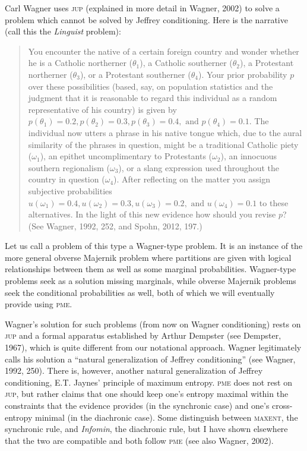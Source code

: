 \documentclass[entropy,article,submit,oneauthor,pdftex,12pt,a4paper]{mdpi}
\newcommand{\qeins}[1]{``#1''}
\newenvironment{quotex}{\begin{quote}\begin{footnotesize}}{\end{footnotesize}\end{quote}}
\begin{document}
Carl Wagner uses \textsc{jup} (explained in more detail in
Wagner, 2002) to solve a problem which cannot be solved by
Jeffrey conditioning. Here is the narrative (call this the
\emph{Linguist} problem):

\begin{quotex}
  You encounter the native of a certain foreign country and wonder
  whether he is a Catholic northerner ($\theta_{1}$), a Catholic
  southerner ($\theta_{2}$), a Protestant northerner ($\theta_{3}$),
  or a Protestant southerner ($\theta_{4}$). Your prior probability
  $p$ over these possibilities (based, say, on population statistics
  and the judgment that it is reasonable to regard this individual as
  a random representative of his country) is given by
  $p(\theta_{1})=0.2,p(\theta_{2})=0.3,p(\theta_{3})=0.4,\mbox{ and
  }p(\theta_{4})=0.1$. The individual now utters a phrase in his
  native tongue which, due to the aural similarity of the phrases in
  question, might be a traditional Catholic piety ($\omega_{1}$), an
  epithet uncomplimentary to Protestants ($\omega_{2}$), an innocuous
  southern regionalism ($\omega_{3}$), or a slang expression used
  throughout the country in question ($\omega_{4}$). After reflecting
  on the matter you assign subjective probabilities
  $u(\omega_{1})=0.4,u(\omega_{2})=0.3,u(\omega_{3})=0.2,\mbox{ and
  }u(\omega_{4})=0.1$ to these alternatives. In the light of this new
  evidence how should you revise $p$? (See
  Wagner, 1992, 252, and Spohn, 2012, 197.)
\end{quotex}

Let us call a problem of this type a Wagner-type problem. It is an
instance of the more general obverse Majernik problem where partitions
are given with logical relationships between them as well as some
marginal probabilities. Wagner-type problems seek as a solution
missing marginals, while obverse Majernik problems seek the
conditional probabilities as well, both of which we will eventually
provide using \textsc{pme}.

Wagner's solution for such problems (from now on Wagner conditioning)
rests on \textsc{jup} and a formal apparatus established by Arthur
Dempster (see Dempster, 1967), which is quite different from
our notational approach. Wagner legitimately calls his solution a
\qeins{natural generalization of Jeffrey conditioning} (see
Wagner, 1992, 250). There is, however, another natural
generalization of Jeffrey conditioning, E.T. Jaynes' principle of
maximum entropy. \textsc{pme} does not rest on \textsc{jup}, but
rather claims that one should keep one's entropy maximal within the
constraints that the evidence provides (in the synchronic case) and
one's cross-entropy minimal (in the diachronic case). Some distinguish
between \textsc{maxent}, the synchronic rule, and \emph{Infomin}, the
diachronic rule, but I have shown elsewhere that the two are
compatible and both follow \textsc{pme} (see also
Wagner, 2002).
\end{document}
